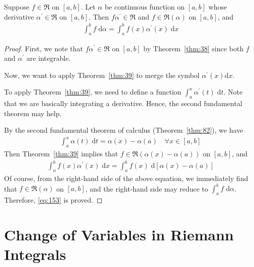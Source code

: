 \documentclass[thmcnt=section, 12pt]{my-elegantbook}
\begin{document}
\begin{theorem} \label{thm:91}
    Suppose $f \in \mathfrak{R}$ on $[a, b]$.
    Let $\alpha$ be continuous function on $[a, b]$
    whose derivative $\alpha^\prime \in \mathfrak{R}$ on $[a, b]$.
    Then $f \alpha^\prime \in \mathfrak{R}$
    and $f \in \mathfrak{R}(\alpha)$ on $[a, b]$, and
    \begin{align}
        \int_a^b f \; \mathrm{d} \alpha
        = \int_a^b f(x) \alpha^\prime(x) \; \mathrm{d} x
        \label{eq:153}
    \end{align}
\end{theorem}

\begin{proof}
    First, we note that $f \alpha^\prime \in \mathfrak{R}$ on $[a, b]$
    by Theorem~\ref{thm:38}
    since both $f$ and $\alpha^\prime$ are integrable.

    Now, we want to apply Theorem~\ref{thm:39}
    to merge the symbol $\alpha^\prime(x) \mathrm{d} x$.
    \begin{note}
        To apply Theorem~\ref{thm:39},
        we need to define a
        function $\int_a^x \alpha^\prime(t) \; \mathrm{d} t$.
        Note that we are basically integrating a derivative.
        Hence, the second fundamental theorem may help.
    \end{note}
    \noindent By the second fundamental theorem of calculus
    (Theorem~\ref{thm:82}),
    we have
    \begin{align*}
        \int_a^x \alpha(t) \; \mathrm{d} t
        = \alpha(x) - \alpha(a)
        \quad
        \forall x \in [a, b]
    \end{align*}
    Then Theorem~\ref{thm:39} implies
    that $f \in \mathfrak{R}( \alpha(x) - \alpha(a) )$
    on $[a, b]$,
    and
    \begin{align*}
        \int_a^b f(x) \alpha^\prime(x) \; \mathrm{d} x
        = \int_a^b f(x) \; \mathrm{d} [ \alpha(x) - \alpha(a) ]
    \end{align*}
    Of course, from the right-hand side of the above equation,
    we immediately find that $f \in \mathfrak{R}(\alpha)$ on $[a, b]$,
    and the right-hand side may
    reduce to $\int_a^b f \; \mathrm{d} \alpha$.
    Therefore, \eqref{eq:153} is proved.
\end{proof}


\section{Change of Variables in Riemann Integrals}
\end{document}
